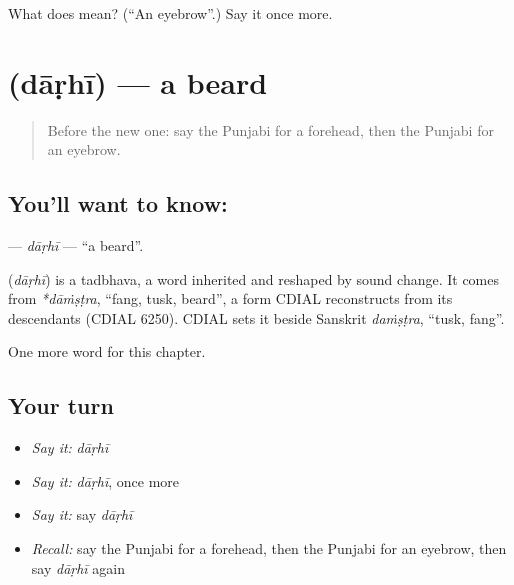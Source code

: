 \begin{tcolorbox}[breakable,colback=teal!4,colframe=teal!35!black,title={Before you move on}]
What does  mean? (\textquotedblleft{}An eyebrow\textquotedblright{}.) Say it once more.
\end{tcolorbox}
\section[\texorpdfstring{\pa{ਦਾੜ੍ਹੀ} (dāṛhī)}{ਦਾੜ੍ਹੀ (dāṛhī)}]{ (dāṛhī) — a beard}

\label{lesson:PA-C134-darhi}



\begin{quote}
Before the new one: say the Punjabi for a forehead, then the Punjabi for an eyebrow.
\end{quote}

\subsection*{You'll want to know: }
\textbf{} — \emph{dāṛhī} — \textquotedblleft{}a beard\textquotedblright{}.

\begin{cousinweb}
\textbf{} (\emph{dāṛhī}) is a tadbhava, a word inherited and reshaped by sound change. It comes from \emph{*dāṁṣṭra}, \textquotedblleft{}fang, tusk, beard\textquotedblright{}, a form CDIAL reconstructs from its descendants (CDIAL 6250). CDIAL sets it beside Sanskrit \emph{daṁṣṭra}, \textquotedblleft{}tusk, fang\textquotedblright{}.
\end{cousinweb}

\begin{grammarlens}[title={What you've built}]
One more word for this chapter.
\end{grammarlens}

\subsection*{Your turn}
\begin{itemize}
\raggedright
  \item \emph{Say it:} \emph{dāṛhī}
  \item \emph{Say it:} \emph{dāṛhī}, once more
  \item \emph{Say it:} say \emph{dāṛhī}
  \item \emph{Recall:} say the Punjabi for a forehead, then the Punjabi for an eyebrow, then say \emph{dāṛhī} again
\end{itemize}

